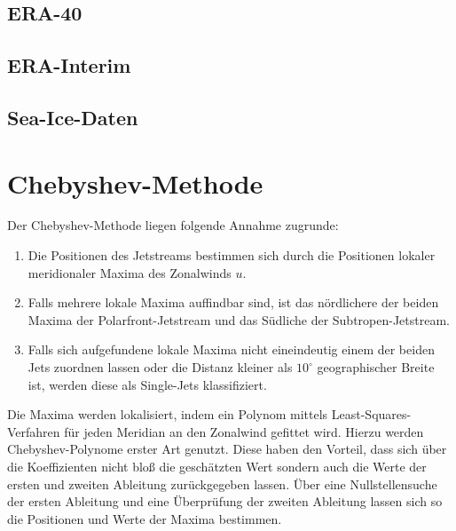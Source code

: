 \subsection{ERA-40}
\citep{uppala-2005}
\subsection{ERA-Interim}
\citep{dee-2011}
\subsection{Sea-Ice-Daten}
\citep{sii-2016}

\section{Chebyshev-Methode}
Der Chebyshev-Methode liegen folgende Annahme zugrunde:
\begin{enumerate}
  \item Die Positionen des Jetstreams bestimmen sich durch die Positionen lokaler meridionaler Maxima des Zonalwinds $u$.
  \item Falls mehrere lokale Maxima auffindbar sind, ist das nördlichere der beiden Maxima der Polarfront-Jetstream und das Südliche der Subtropen-Jetstream.
  \item Falls sich aufgefundene lokale Maxima nicht eineindeutig einem der beiden Jets zuordnen lassen oder die Distanz kleiner als $10^\circ$ geographischer Breite ist, werden diese als Single-Jets klassifiziert.
\end{enumerate}
Die Maxima werden lokalisiert, indem ein Polynom mittels Least-Squares-Verfahren für jeden Meridian an den Zonalwind gefittet wird. Hierzu werden Chebyshev-Polynome erster Art genutzt. Diese haben den Vorteil, dass sich über die Koeffizienten nicht bloß die geschätzten Wert sondern auch die Werte der ersten und zweiten Ableitung zurückgegeben lassen. Über eine Nullstellensuche der ersten Ableitung und eine Überprüfung der zweiten Ableitung lassen sich so die Positionen und Werte der Maxima bestimmen.

